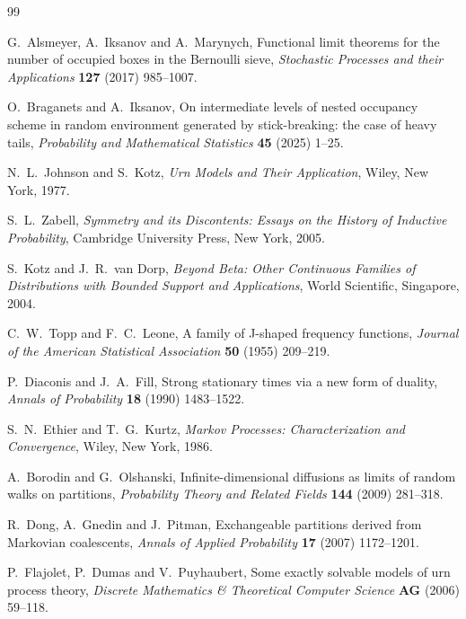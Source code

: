 \documentclass[11pt,reqno]{amsart}
\theoremstyle{definition}
\theoremstyle{remark}
\numberwithin{equation}{section}
\begin{document}
\begin{thebibliography}{99}

G.~Alsmeyer, A.~Iksanov and A.~Marynych,
Functional limit theorems for the number of occupied boxes in the Bernoulli sieve,
\textit{Stochastic Processes and their Applications} \textbf{127} (2017) 985--1007.

O.~Braganets and A.~Iksanov,
On intermediate levels of nested occupancy scheme in random environment generated by stick-breaking: the case of heavy tails,
\textit{Probability and Mathematical Statistics} \textbf{45} (2025) 1--25.

N.~L.~Johnson and S.~Kotz,
\textit{Urn Models and Their Application},
Wiley, New York, 1977.

S.~L.~Zabell,
\textit{Symmetry and its Discontents: Essays on the History of Inductive Probability},
Cambridge University Press, New York, 2005.

S.~Kotz and J.~R.~van Dorp,
\textit{Beyond Beta: Other Continuous Families of Distributions with Bounded Support and Applications},
World Scientific, Singapore, 2004.

C.~W.~Topp and F.~C.~Leone,
A family of J-shaped frequency functions,
\textit{Journal of the American Statistical Association} \textbf{50} (1955) 209--219.

P.~Diaconis and J.~A.~Fill,
Strong stationary times via a new form of duality,
\textit{Annals of Probability} \textbf{18} (1990) 1483--1522.

S.~N.~Ethier and T.~G.~Kurtz,
\textit{Markov Processes: Characterization and Convergence},
Wiley, New York, 1986.

A.~Borodin and G.~Olshanski,
Infinite-dimensional diffusions as limits of random walks on partitions,
\textit{Probability Theory and Related Fields} \textbf{144} (2009) 281--318.

R.~Dong, A.~Gnedin and J.~Pitman,
Exchangeable partitions derived from Markovian coalescents,
\textit{Annals of Applied Probability} \textbf{17} (2007) 1172--1201.

P.~Flajolet, P.~Dumas and V.~Puyhaubert,
Some exactly solvable models of urn process theory,
\textit{Discrete Mathematics \& Theoretical Computer Science} \textbf{AG} (2006) 59--118.


\end{thebibliography}
\end{document}
